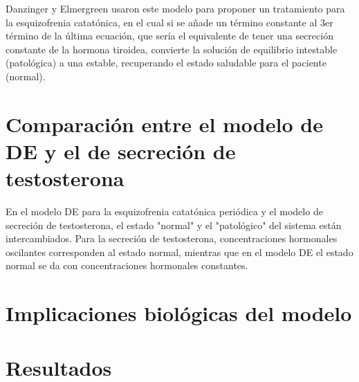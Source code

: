\documentclass[letter,11pt]{article}
\begin{document}
Danzinger y Elmergreen usaron este modelo para proponer un tratamiento para la esquizofrenia catatónica, en el cual si se añade un término constante al 3er término de la última ecuación, que sería el equivalente de tener una secreción constante de la hormona tiroidea, convierte la solución de equilibrio intestable (patológica) a una estable, recuperando el estado saludable para el paciente (normal). 

\section{Comparación entre el modelo de DE y el de secreción de testosterona}

En el modelo DE para la esquizofrenia catatónica periódica y el modelo de secreción de testosterona, el estado "normal" y el "patológico" del sistema están intercambiados. Para la secreción de testosterona, concentraciones hormonales oscilantes corresponden al estado normal, mientras que en el modelo DE el estado normal se da con concentraciones hormonales constantes.


\section{Implicaciones biológicas del modelo}



\section{Resultados}
\end{document}

